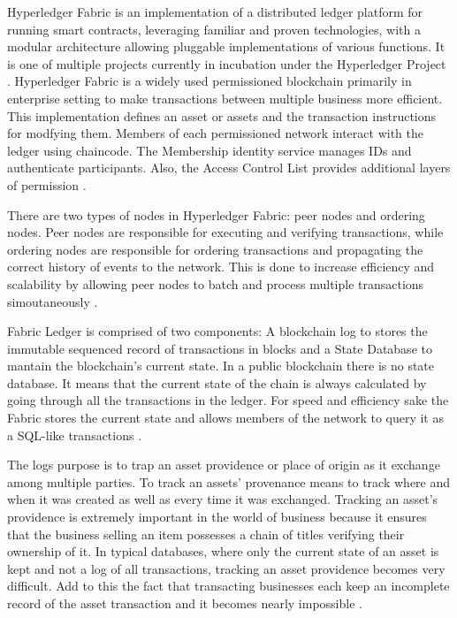 Hyperledger Fabric is an implementation of a distributed ledger platform for running smart contracts, leveraging familiar and proven technologies, with a modular architecture allowing pluggable implementations of various functions. It is one of multiple projects currently in incubation under the Hyperledger Project \cite{cachin2016architecture}. Hyperledger Fabric is a widely used permissioned blockchain primarily in enterprise setting to make transactions between multiple business more efficient. This implementation defines an asset or assets and the transaction instructions for modfying them. Members of each permissioned network interact with the ledger using chaincode. The Membership identity service manages IDs and authenticate participants. Also, the Access Control List provides additional layers of permission \cite{blockgeeks2018deeper}.

There are two types of nodes in Hyperledger Fabric: peer nodes and ordering nodes. Peer nodes are responsible for executing and verifying transactions, while ordering nodes are responsible for ordering transactions and propagating the correct history of events to the network. This is done to increase efficiency and scalability by allowing peer nodes to batch and process multiple transactions simoutaneously \cite{buterin2016smart}. 

Fabric Ledger is comprised of two components: A blockchain log to stores the immutable sequenced record of transactions in blocks and a State Database to mantain the blockchain's current state. In a public blockchain there is no state database. It means that the current state of the chain is always calculated by going through all the transactions in the ledger. For speed and efficiency sake the Fabric stores the current state  and allows members of the network to query it as a SQL-like transactions \cite{blockgeeks2016blockchain}. 

The logs purpose is to trap an asset providence or place of origin as it exchange among multiple parties. To track an assets' provenance means to track where and when it was created as well as every time it was exchanged. Tracking an asset's providence is extremely important in the world of business because it ensures that the business selling an item possesses a chain of titles verifying their ownership of it. In typical databases, where only the current state of an asset is kept and not a log of all transactions, tracking an asset providence becomes very difficult. Add to this the fact that transacting businesses each keep an incomplete record of the asset transaction and it becomes nearly impossible \cite{blockgeeks2016blockchain}.

